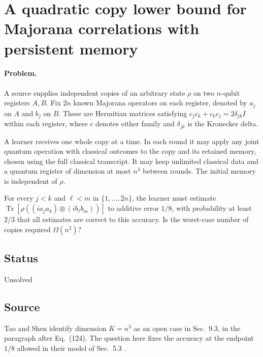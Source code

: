 \section{A quadratic copy lower bound for Majorana correlations with persistent memory}
\label{sec:op_dc24864a357ab2ed}

\paragraph{Problem.}
A source supplies independent copies of an arbitrary state $\rho$ on two $n$-qubit registers $A,B$. Fix $2n$ known Majorana operators on each register, denoted by $a_j$ on $A$ and $b_j$ on $B$. These are Hermitian matrices satisfying $c_jc_k+c_kc_j=2\delta_{jk}I$ within each register, where $c$ denotes either family and $\delta_{jk}$ is the Kronecker delta.

A learner receives one whole copy at a time. In each round it may apply any joint quantum operation with classical outcomes to the copy and its retained memory, chosen using the full classical transcript. It may keep unlimited classical data and a quantum register of dimension at most $n^3$ between rounds. The initial memory is independent of $\rho$.

For every $j<k$ and $\ell<m$ in $\{1,\ldots,2n\}$, the learner must estimate $\operatorname{Tr}[\rho((i a_j a_k)\otimes(i b_\ell b_m))]$ to additive error $1/8$, with probability at least $2/3$ that all estimates are correct to this accuracy. Is the worst-case number of copies required $\Omega(n^2)$?

\subsection*{Status}

Unsolved

\subsection*{Source}

Tao and Shen identify dimension $K=n^3$ as an open case in Sec.~9.3, in the paragraph after Eq.~(124). The question here fixes the accuracy at the endpoint $1/8$ allowed in their model of Sec.~5.3 .

